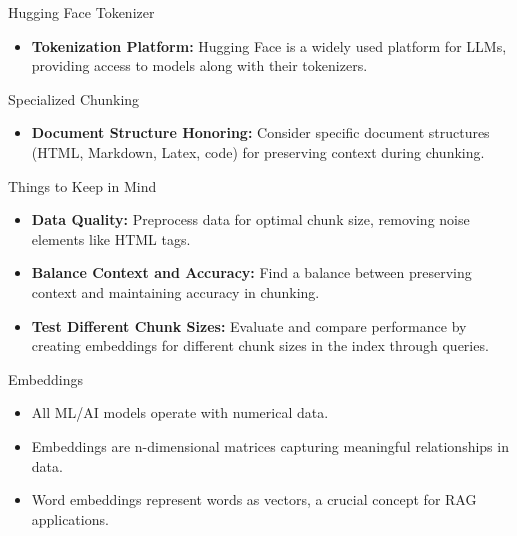 \begin{frame}[fragile]{Hugging Face Tokenizer}
  \begin{itemize}
    \item \textbf{Tokenization Platform:} Hugging Face is a widely used platform for LLMs, providing access to models along with their tokenizers.
  \end{itemize}
\end{frame}

\begin{frame}[fragile]{Specialized Chunking}
  \begin{itemize}
    \item \textbf{Document Structure Honoring:} Consider specific document structures (HTML, Markdown, Latex, code) for preserving context during chunking.
  \end{itemize}
\end{frame}

\begin{frame}[fragile]{Things to Keep in Mind}
  \begin{itemize}
    \item \textbf{Data Quality:} Preprocess data for optimal chunk size, removing noise elements like HTML tags.
    \item \textbf{Balance Context and Accuracy:} Find a balance between preserving context and maintaining accuracy in chunking.
    \item \textbf{Test Different Chunk Sizes:} Evaluate and compare performance by creating embeddings for different chunk sizes in the index through queries.
  \end{itemize}
\end{frame}

\begin{frame}[fragile]{Embeddings}
  \begin{itemize}
    \item All ML/AI models operate with numerical data.
    \item Embeddings are n-dimensional matrices capturing meaningful relationships in data.
    \item Word embeddings represent words as vectors, a crucial concept for RAG applications.
  \end{itemize}
\end{frame}


